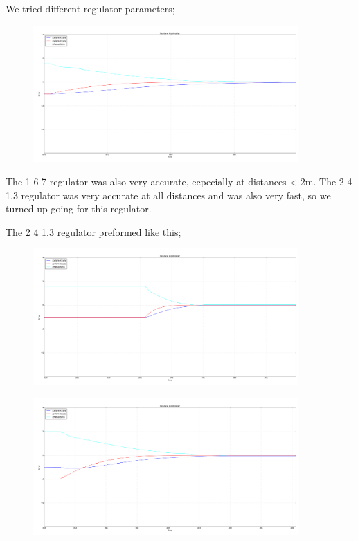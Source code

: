 \documentclass[a4paper,10pt]{article}
\begin{document}
		We tried different regulator parameters;

		\begin{figure}[H]
		\centering
		\includegraphics[width=0.9\textwidth]{rover2_rqt_plot94_167.png}
		\end{figure}


		The 1 6 7 regulator was also very accurate, ecpecially at distances < 2m. The 2 4 1.3 regulator was very accurate at all distances and was also very fast, so we turned up going for this regulator.





		The 2 4 1.3 regulator preformed like this;

		\begin{figure}[H]
		\centering
		\includegraphics[width=0.9\textwidth]{rover2_rqt_plot9_0.png}
		\end{figure}



		\begin{figure}[H]
		\centering
		\includegraphics[width=0.9\textwidth]{rover2_rqt_plot91.png}
		\end{figure}
\end{document}
